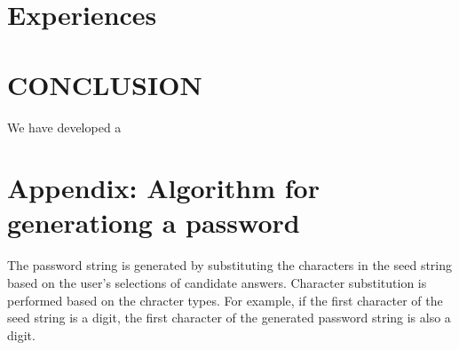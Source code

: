 \documentclass{article}
\begin{document}
% 
% 
% 
% 
% 
%

\section{Experiences}


\section{CONCLUSION}

We have developed a 

%
%

{%


}

\section*{Appendix: Algorithm for generationg a password}



The password string is generated by
substituting the characters in the seed string
based on the user's selections of candidate answers.
Character substitution is performed based on the chracter types.
For example, if the first character of the seed string is a digit,
the first character of the generated password string is also a digit.
\end{document}
